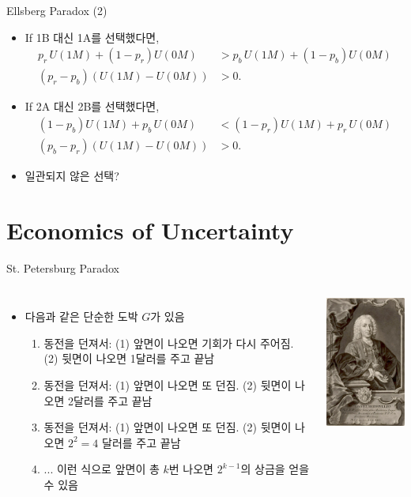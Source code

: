 \documentclass[final]{beamer}
\begin{document}
\begin{frame}[t]{Ellsberg Paradox (2)}
	\begin{itemize}
		\item If 1B 대신 1A를 선택했다면,
	\begin{align*}
	p_r{\,}U(1M) + (1-p_r) U(0M) & > p_b{\,}U(1M) + (1-p_b) U(0M)\\
	(p_r-p_b) \left( U(1M)-U(0M) \right) &>0.
	\end{align*}
		\item If 2A 대신 2B를 선택했다면,
	\begin{align*}
	(1-p_b)U(1M) + p_b{\,}U(0M)  & < (1-p_r)U(1M) + p_r{\,}U(0M)\\
	(p_b-p_r) \left( U(1M)-U(0M) \right) & >0.
	\end{align*}
	\item 일관되지 않은 선택?
	\end{itemize}
\end{frame}


\section{Economics of Uncertainty} %
\label{sec:economics_of_uncertainty}

\begin{frame}[t]{St. Petersburg Paradox}
	\begin{columns}
		\begin{itemize}
			\item 다음과 같은 단순한 도박 $G$가 있음
			\begin{enumerate}
				\item 동전을 던져서: (1) 앞면이 나오면 기회가 다시 주어짐. (2) 뒷면이 나오면 1달러를 주고 끝남
				\item 동전을 던져서: (1) 앞면이 나오면 또 던짐. (2) 뒷면이 나오면 2달러를 주고 끝남
				\item 동전을 던져서: (1) 앞면이 나오면 또 던짐. (2) 뒷면이 나오면 $2^2=4$ 달러를 주고 끝남
				\item ... 이런 식으로 앞면이 총 $k$번 나오면 $2^{k-1}$의 상금을 얻을 수 있음
			\end{enumerate}
		\end{itemize}
		{\includegraphics[width=11em]{daniel_Bernoulli.jpg}}
	\end{columns}
\end{frame}
\end{document}
